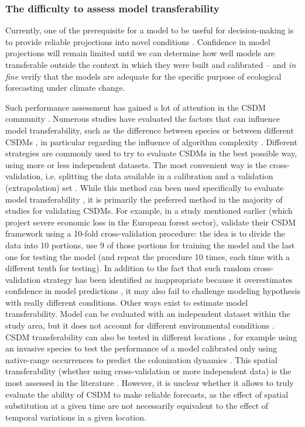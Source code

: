 \subsubsection{The difficulty to assess model transferability}

Currently, one of the prerequisite for a model to be useful for decision-making is to provide reliable projections into novel conditions \citep{Evans2012, Yates2018}. Confidence in model projections will remain limited until we can determine how well models are transferable outside the context in which they were built and calibrated -- and \emph{in fine} verify that the models are adequate for the specific purpose of ecological forecasting under climate change.

Such performance assessment has gained a lot of attention in the CSDM community \citep{Yates2018}. Numerous studies have evaluated the factors that can influence model transferability, such as the difference between species \citep{Guisan2007, Dobrowski2011, Wogan2016} or between different CSDMs \citep{Meynard2007, Valavi2022}, in particular regarding  the influence of algorithm complexity \citep{MorenoAmat2015, Bell2016, GarciaCallejas2016}. Different strategies are commonly used to try to evaluate CSDMs in the best possible way, using more or less independent datasets. The most convenient way is the cross-validation, i.e. splitting the data available in a calibration and a validation (extrapolation) set \citep{Roberts2017}. While this method can been used specifically to evaluate model transferability \citep{Wenger2012}, it is primarily the preferred method in the majority of studies for validating CSDMs. For example, in a study mentioned earlier (which project severe economic loss in the European forest sector), \citet{Hanewinkel2013} validate their CSDM framework using a 10-fold cross-validation procedure: the idea is to divide the data into 10 portions, use 9 of those portions for training the model and the last one for testing the model (and repeat the procedure 10 times, each time with a different tenth for testing). In addition to the fact that such random cross-validation strategy has been identified as inappropriate because it overestimates confidence in model predictions \citep{Roberts2017}, it may also fail to challenge modeling hypothesis with really different conditions. Other ways exist to estimate model transferability. Model can be evaluated with an independent dataset within the study area, but it does not account for different environmental conditions \citep{Guisan2007}. CSDM transferability can also be tested in different locations \citep{Randin2006, Torres2015, Sequeira2018}, for example using an invasive species to test the performance of a model calibrated only using native-range occurrences to predict the colonization dynamics \citep{Zhu2017, BarbetMassin2018}. This spatial transferability (whether using cross-validation or more independent data) is the most assessed in the literature \citep{Yates2018}. However, it is unclear whether it allows to truly evaluate the ability of CSDM to make reliable forecasts, as the effect of spatial substitution at a given time are not necessarily equivalent to the effect of temporal variations in a given location. 
